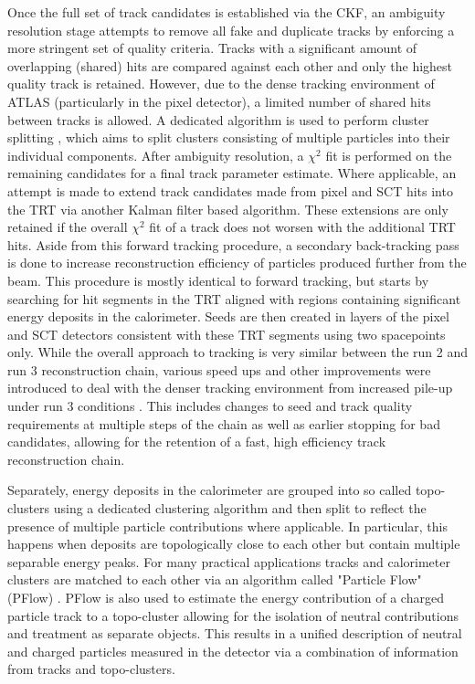 Once the full set of track candidates is established via the CKF, an ambiguity resolution stage attempts to remove 
all fake and duplicate tracks by enforcing a more stringent set of quality criteria. Tracks with a significant 
amount of overlapping (shared) hits are compared against each other and only the highest quality track is retained. 
However, due to the dense tracking environment of ATLAS (particularly in the pixel detector), a limited number of 
shared hits between tracks is allowed. A dedicated algorithm is used to perform cluster splitting 
\cite{atlas-cluster-splitting}, which aims to split clusters consisting of multiple particles into their individual 
components. After ambiguity resolution, a $\chi^2$ fit is performed on the remaining candidates for a final track 
parameter estimate. Where applicable, an attempt is made to extend track candidates made from pixel and SCT hits 
into the TRT via another Kalman filter based algorithm. These extensions are only retained if the overall $\chi^2$ 
fit of a track does not worsen with the additional TRT hits. Aside from this forward tracking procedure, a 
secondary back-tracking pass is done to increase reconstruction efficiency of particles produced further from the 
beam. This procedure is mostly identical to forward tracking, but starts by searching for hit segments in the TRT 
aligned with regions containing significant energy deposits in the calorimeter. Seeds are then created in layers 
of the pixel and SCT detectors consistent with these TRT segments using two spacepoints only. While the overall 
approach to tracking is very similar between the run 2 and run 3 reconstruction chain, various speed ups and other
improvements were introduced to deal with the denser tracking environment from increased pile-up under run 3 
conditions \cite{atlas-run3-tracking}. This includes changes to seed and track quality requirements at multiple 
steps of the chain as well as earlier stopping for bad candidates, allowing for the retention of a fast, high 
efficiency track reconstruction chain. \par 

Separately, energy deposits in the calorimeter are grouped into so called topo-clusters using a dedicated clustering 
algorithm \cite{atlas-calo-cluster} and then split to reflect the presence of multiple particle contributions where 
applicable. In particular, this happens when deposits are topologically close to each other but contain multiple 
separable energy peaks. For many practical applications tracks and calorimeter clusters are matched to each other via 
an algorithm called "Particle Flow" (PFlow) \cite{atlas-pflow}. PFlow is also used to estimate the energy contribution 
of a charged particle track to a topo-cluster allowing for the isolation of neutral contributions and treatment as 
separate objects. This results in a unified description of neutral and charged particles measured in the detector 
via a combination of information from tracks and topo-clusters. \par


